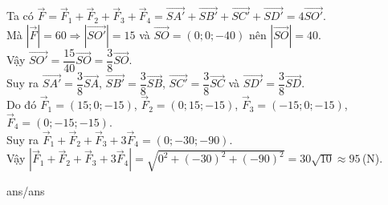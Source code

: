 \begin{ex}
{ Ta có 
 $\overrightarrow{F}=\overrightarrow{F}_1+\overrightarrow{F}_2+\overrightarrow{F}_3+\overrightarrow{F}_4=\overrightarrow{SA'}+\overrightarrow{SB'}+\overrightarrow{SC'}+\overrightarrow{SD'}=4\overrightarrow{SO'}$.\\
 Mà $\left| \overrightarrow{F} \right|=60\Rightarrow \left| \overrightarrow{SO'} \right|=15$ và $\overrightarrow{SO}=(0;0;-40)$ nên $\left| \overrightarrow{SO} \right|=40$.\\
 Vậy $\overrightarrow{SO'}=\dfrac{15}{40}\overrightarrow{SO}=\dfrac{3}{8}\overrightarrow{SO}$.\\
 Suy ra
 $\overrightarrow{SA'}=\dfrac{3}{8}\overrightarrow{SA}$, 
 $\overrightarrow{SB'}=\dfrac{3}{8}\overrightarrow{SB}$, 
 $\overrightarrow{SC'}=\dfrac{3}{8}\overrightarrow{SC}$ và 
 $\overrightarrow{SD'}=\dfrac{3}{8}\overrightarrow{SD}$.\\
 Do đó $\overrightarrow{F}_1=(15;0;-15)$, $\overrightarrow{F}_2=(0;15;-15)$, $\overrightarrow{F}_3=(-15;0;-15)$, $\overrightarrow{F}_4=(0;-15;-15)$.\\
 Suy ra $\overrightarrow{F}_1+\overrightarrow{F}_2+\overrightarrow{F}_3+3\overrightarrow{F}_4=(0;-30;-90)$. \\
 Vậy $\left| \overrightarrow{F}_1+\overrightarrow{F}_2+\overrightarrow{F}_3+3\overrightarrow{F}_4 \right|=\sqrt{0^2+(-30)^2+(-90)^2}=30\sqrt{10}\approx 95$\,(N).
 }
\end{ex}
 
\begin{indapan}
	{ans/ans\currfilebase}
\end{indapan}


